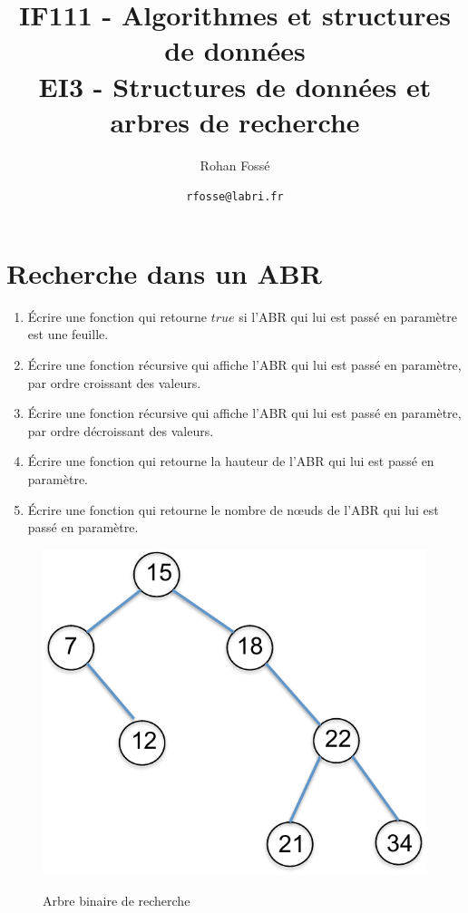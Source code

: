 \documentclass{article}[12pt]
\title{IF111 - Algorithmes et structures de données\\EI3 - Structures de données et arbres de recherche}
\date{\texttt{rfosse@labri.fr}}
\author{Rohan Fossé}
\begin{document}
\maketitle{}


\section*{Recherche dans un ABR}
\begin{enumerate}
    \item Écrire une fonction qui retourne $true$ si l’ABR qui lui est passé en paramètre
est une feuille.
    \item  Écrire une fonction récursive qui affiche l’ABR qui lui est passé en paramètre, par ordre croissant des valeurs.
    \item Écrire une fonction récursive qui affiche l’ABR qui lui est passé en paramètre, par ordre décroissant des valeurs.
    \item Écrire une fonction qui retourne la hauteur de l’ABR qui lui est passé en
paramètre.
\item Écrire une fonction qui retourne le nombre de nœuds de l’ABR qui lui est
passé en paramètre.
\end{enumerate}

\begin{figure}[hbtp] 
  \centering
\includegraphics[scale =0.5] {ABR.pdf}\label{fig:abr} \caption{Arbre binaire de recherche}
\end{figure}
\end{document}
